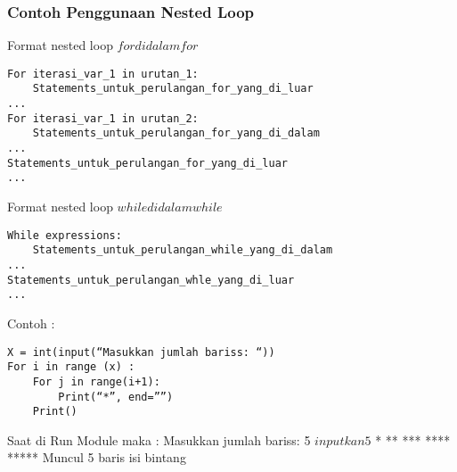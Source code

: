 \subsubsection{Contoh Penggunaan Nested Loop}
Format nested loop \(for di dalam for\)
\begin{verbatim}
For iterasi_var_1 in urutan_1:
	Statements_untuk_perulangan_for_yang_di_luar
...
For iterasi_var_1 in urutan_2:
	Statements_untuk_perulangan_for_yang_di_dalam
...
Statements_untuk_perulangan_for_yang_di_luar
...
\end{verbatim}

Format nested loop \(while di dalam while\)
\begin{verbatim}
While expressions:
	Statements_untuk_perulangan_while_yang_di_dalam
...
Statements_untuk_perulangan_whle_yang_di_luar
...
\end{verbatim}

Contoh :
\begin{verbatim}
X = int(input(“Masukkan jumlah bariss: “))
For i in range (x) :
	For j in range(i+1):
		Print(“*”, end=””)
	Print()
\end{verbatim}
Saat di Run Module maka :
Masukkan jumlah bariss: 5 \(inputkan 5\)
*
**
***
****
***** 
Muncul 5 baris isi bintang

